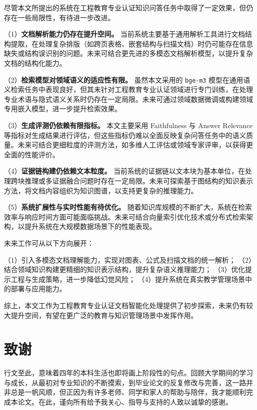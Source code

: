 \documentclass[UTF8,a4paper,zihao=-4]{ctexart}
\begin{document}
尽管本文所提出的系统在工程教育专业认证知识问答任务中取得了一定效果，但仍存在一些局限性，有待进一步改进。

（1）\textbf{文档解析能力仍存在提升空间。}  
当前系统主要基于通用解析工具进行文档结构提取，在处理复杂排版（如跨页表格、嵌套结构与扫描文档）时仍可能存在信息缺失或结构误识别的问题。未来可结合更先进的多模态文档解析模型，以提升复杂文档的结构化能力。

（2）\textbf{检索模型对领域语义的适应性有限。}  
虽然本文采用的 \texttt{bge-m3} 模型在通用语义检索任务中表现良好，但其未针对工程教育专业认证领域进行专门训练，在处理专业术语与隐式语义关系时仍存在一定局限。未来可通过领域数据微调或构建领域专用嵌入模型，进一步提升检索效果。

（3）\textbf{生成评测仍依赖有限指标。}  
本文主要采用 Faithfulness 与 Answer Relevance 等指标对生成结果进行评估，但这些指标仍难以全面反映复杂问答任务中的语义质量。未来可结合更细粒度的评测方法，如多维人工评估或领域专家评审，以获得更全面的性能评价。

（4）\textbf{证据链构建仍依赖文本粒度。}  
当前系统的证据链以文本块为基本单位，在处理跨块推理或多证据融合问题时存在一定局限。未来可探索基于图结构的知识表示方法，将文档内容组织为知识图谱，以支持更复杂的推理能力。

（5）\textbf{系统扩展性与实时性能有待优化。}  
随着知识库规模的不断扩大，系统在检索效率与响应时间方面可能面临挑战。未来可结合向量索引优化技术或分布式检索架构，以提升系统在大规模数据场景下的性能表现。

未来工作可从以下方向展开：

（1）引入多模态文档理解能力，实现对图表、公式及扫描文档的统一解析；  
（2）结合领域知识构建更精细的知识表示结构，提升复杂语义推理能力；  
（3）优化提示工程与生成策略，进一步降低幻觉风险；  
（4）提升系统在真实教学管理场景中的部署与应用能力。

综上，本文工作为工程教育专业认证文档智能化处理提供了初步探索，未来仍有较大提升空间，有望在更广泛的教育与知识管理场景中发挥作用。


\clearpage
\section*{致谢}

行文至此，意味着四年的本科生活也即将画上阶段性的句点。回顾大学期间的学习与成长，从最初对专业知识的不断摸索，到毕业论文的反复修改与完善，这一路并非总是一帆风顺，但正因为有许多老师、同学和家人的帮助与陪伴，我才能顺利完成本论文。在此，谨向所有给予我关心、指导与支持的人致以诚挚的感谢。
\end{document}
